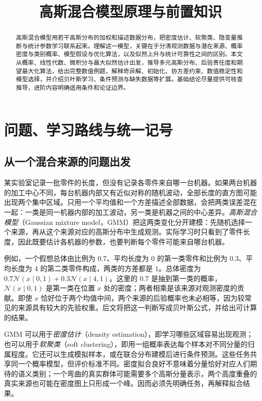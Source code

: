 \documentclass[UTF8,12pt,a4paper,fontset=fandol]{ctexart}
\title{高斯混合模型原理与前置知识}
\author{}
\date{}
\begin{document}
\maketitle

\begin{abstract}
高斯混合模型用若干高斯分布的加权和描述数据分布，把密度估计、软聚类、隐变量推断与统计参数学习联系起来。理解这一模型，关键在于分清观测数据与潜在来源、概率密度与类别概率、模型假设与优化算法，以及似然上升与统计可靠性之间的区别。本文从概率、线性代数、微积分与最大似然估计出发，推导多元高斯分布、后验责任度和期望最大化算法，给出完整数值例题，解释奇异解、初始化、协方差约束、数值稳定性和模型选择，并介绍贝叶斯学习、条件预测与缺失数据等扩展。基础结论尽量提供可核查推导，进阶内容明确适用条件和论证边界。
\end{abstract}
\tableofcontents

\section{问题、学习路线与统一记号}
\label{sec:gmm-introduction}

\subsection{从一个混合来源的问题出发}
某实验室记录一批零件的长度，但没有记录各零件来自哪一台机器。如果两台机器的加工中心不同，每台机器内部又有近似对称的随机波动，全部长度的直方图可能出现两个集中区域。只用一个平均值和一个方差描述全部数据，会把两类误差混在一起：一类是同一机器内部的加工波动，另一类是机器之间的中心差异。\emph{高斯混合模型}（Gaussian mixture model，GMM）把这两类变化分开建模：先随机选择一个来源，再从这个来源对应的高斯分布中生成观测。实际学习时只看到了零件长度，因此既要估计各机器的参数，也要判断每个零件可能来自哪台机器。

例如，一个假想总体由比例为 $0.7$、平均长度为 $0$ 的第一类零件和比例为 $0.3$、平均长度为 $4$ 的第二类零件构成，两类的方差都是 $1$。总体密度为 $0.7\mathcal N(x\mid0,1)+0.3\mathcal N(x\mid4,1)$。这里的 $0.7$ 是抽到第一类的概率，$\mathcal N(x\mid0,1)$ 是第一类在位置 $x$ 处的密度；两者相乘是该来源对观测密度的贡献。即使 $x$ 恰好位于两个均值中间，两个来源的后验概率也未必相等，因为较常见的来源具有较大的先验权重。后文将把这一判断写成贝叶斯公式，并给出可计算的结果。

GMM 可以用于\emph{密度估计}（density estimation），即学习哪些区域容易出现观测；也可以用于\emph{软聚类}（soft clustering），即用一组概率表达每个样本对不同分量的归属程度。它还可以生成模拟样本，或在联合分布建模后进行条件预测。这些任务共享同一个概率模型，但评价标准不同。密度拟合良好不意味着分量恰好对应人们期待的语义类别；一个弯曲的真实群体可能需要多个高斯分量表示，两个高度重叠的真实来源也可能在密度图上只形成一个峰。因而必须先明确任务，再解释拟合结果。
\end{document}
